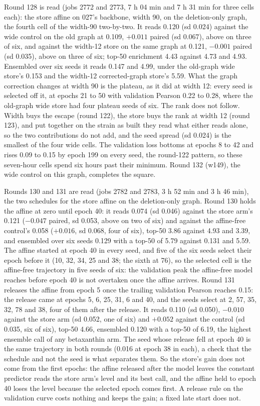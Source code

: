 Round 128 is read (jobs 2772 and 2773, 7 h 04 min and 7 h 31 min for three cells each):
the store affine on 027's backbone, width 90, on the deletion-only graph, the fourth cell
of the width-90 two-by-two. It reads 0.120 (sd 0.024) against the wide control on the old
graph at 0.109, $+0.011$ paired (sd 0.067), above on three of six, and against the
width-12 store on the same graph at 0.121, $-0.001$ paired (sd 0.035), above on three
of six; top-50 enrichment 4.43 against 4.73 and 4.93. Ensembled over six seeds it reads
0.147 and 4.99, under the old-graph wide store's 0.153 and the width-12 corrected-graph
store's 5.59. What the graph correction changes at width 90 is the plateau, as it did at
width 12: every seed is selected off it, at epochs 21 to 50 with validation Pearson 0.22
to 0.28, where the old-graph wide store had four plateau seeds of six. The rank does not
follow. Width buys the escape (round 122), the store buys the rank at width 12 (round
123), and put together on the strain as built they read what either reads alone, so the
two contributions do not add, and the seed spread (sd 0.024) is the smallest of the four
wide cells. The validation loss bottoms at epochs 8 to 42 and rises 0.09 to 0.15 by epoch
199 on every seed, the round-122 pattern, so these seven-hour cells spend six hours past
their minimum. Round 132 (w149), the wide control on this graph, completes the square.

Rounds 130 and 131 are read (jobs 2782 and 2783, 3 h 52 min and 3 h 46 min), the two
schedules for the store affine on the deletion-only graph. Round 130 holds the affine at
zero until epoch 40: it reads 0.074 (sd 0.046) against the store arm's 0.121 ($-0.047$
paired, sd 0.053, above on two of six) and against the affine-free control's 0.058
($+0.016$, sd 0.068, four of six), top-50 3.86 against 4.93 and 3.39, and ensembled over
six seeds 0.129 with a top-50 of 5.79 against 0.131 and 5.59. The affine started at
epoch 40 in every seed, and five of the six seeds select their epoch before it (10, 32,
34, 25 and 38; the sixth at 76), so the selected cell is the affine-free trajectory in
five seeds of six: the validation peak the affine-free model reaches before epoch 40 is
not overtaken once the affine arrives. Round 131 releases the affine from epoch 5 once
the trailing validation Pearson reaches 0.15: the release came at epochs 5, 6, 25, 31, 6
and 40, and the seeds select at 2, 57, 35, 32, 78 and 38, four of them after the
release. It reads 0.110 (sd 0.050), $-0.010$ against the store arm (sd 0.052, one of
six) and $+0.052$ against the control (sd 0.035, six of six), top-50 4.66, ensembled
0.120 with a top-50 of 6.19, the highest ensemble call of any betaxanthin arm. The seed
whose release fell at epoch 40 is the same trajectory in both rounds (0.016 at epoch 38
in each), a check that the schedule and not the seed is what separates them. So the
store's gain does not come from the first epochs: the affine released after the model
leaves the constant predictor reads the store arm's level and its best call, and the
affine held to epoch 40 loses the level because the selected epoch comes first. A
release rule on the validation curve costs nothing and keeps the gain; a fixed late
start does not.


